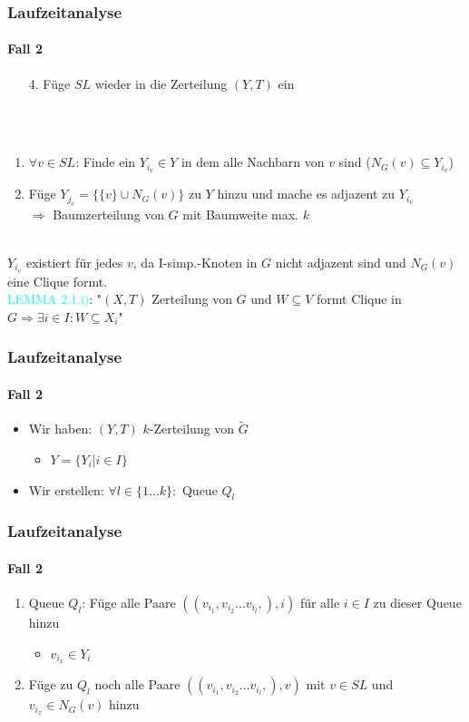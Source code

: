 \begin{frame}
\frametitle{Laufzeitanalyse}
\framesubtitle{Fall 2}

\begin{enumerate}
	\item[4.] Füge $SL$ wieder in die Zerteilung $(Y,T)$ ein
\end{enumerate}
\ \\
\ \\
\begin{enumerate}
	\item $\forall v \in SL$: Finde ein $Y_{i_v} \in Y$ in dem alle Nachbarn von $v$ sind ($N_G(v) \subseteq Y_{i_v}$)
	\item Füge $Y_{j_v} = \{ \{v\} \cup N_G(v) \}$ zu $Y$ hinzu und mache es adjazent zu $Y_{i_v}$ \\
	$\Rightarrow$ Baumzerteilung von $G$ mit Baumweite max. $k$
\end{enumerate}
\ \\
$Y_{i_v}$ existiert für jedes $v$, da I-simp.-Knoten in $G$ nicht adjazent sind und $N_G(v)$ eine Clique formt. \\
\textcolor{cyan}{LEMMA 2.1.i)}: "$(X,T)$ Zerteilung von $G$ und $W \subseteq V$ formt Clique in $G \Rightarrow \exists i \in I: W \subseteq X_i$"
\end{frame}


\begin{frame}
\frametitle{Laufzeitanalyse}
\framesubtitle{Fall 2}

\begin{itemize}
	\item Wir haben: $(Y,T)$ $k$-Zerteilung von $\widetilde{G}$
	\begin{itemize}
		\item $Y = \{ Y_i | i \in I \}$
	\end{itemize}

	\item Wir erstellen: $\forall l \in \{1 \dots k\}:$ Queue $Q_l$
\end{itemize}

\end{frame}


\begin{frame}
\frametitle{Laufzeitanalyse}
\framesubtitle{Fall 2}

\begin{enumerate}
	\item Queue $Q_l$: Füge alle Paare $((v_{i_1}, v_{i_2} \dots v_{i_l},), i)$ für alle $i \in I$ zu dieser Queue hinzu
	\begin{itemize}
		\item $v_{i_x} \in Y_i$
	\end{itemize}
	
	\item Füge zu $Q_l$ noch alle Paare $((v_{i_1}, v_{i_2} \dots v_{i_l},), v)$ mit $v \in SL$ und $v_{i_x} \in N_G(v)$ hinzu 
\end{enumerate}

\end{frame}


